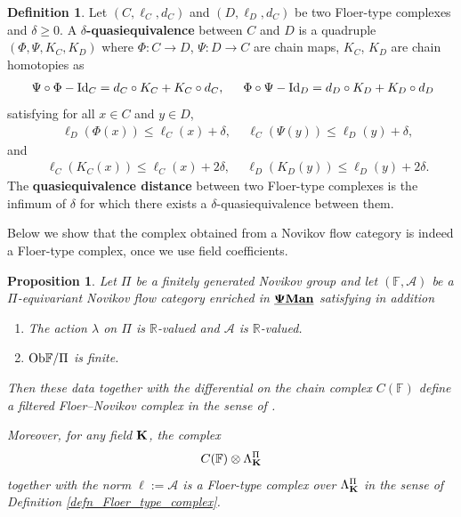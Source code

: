 \documentclass[reqno, 10pt]{amsart}
\numberwithin{equation}{section}
\numberwithin{equation}{section}
\newtheorem{prop}[thm]{Proposition}
\theoremstyle{definition}
\newtheorem{defn}[thm]{Definition}
\theoremstyle{remark}
\newcommand{\beqn}{\begin{equation*}}
\newcommand{\eeqn}{\end{equation*}}
\newcommand{\mb}{\mathbb}
\newcommand{\mc}{\mathcal}
\newcommand{\pman}{\uds{{\bf \Psi}{\bf Man}}}
\newcommand{\uds}[1]{\underline{\smash{#1}}}
\begin{document}
\begin{defn}
Let $(C, \ell_C, d_C)$ and $(D, \ell_D, d_C)$ be two Floer-type complexes and $\delta \geq 0$. A {\bf $\delta$-quasiequivalence} between $C$ and $D$ is a quadruple $(\Phi, \Psi, K_C, K_D)$ where $\Phi: C \to D$, $\Psi: D \to C$ are chain maps, $K_C$, $K_D$ are chain homotopies as
\begin{align*}
    &\ \Psi \circ \Phi - {\rm Id}_C = d_C \circ K_C + K_C \circ d_C,\ &\ \Phi \circ \Psi - {\rm Id}_D = d_D \circ K_D + K_D \circ d_D
\end{align*}
satisfying for all $x \in C$ and $y \in D$, 
\begin{align*}
&\ \ell_D(\Phi(x)) \leq \ell_C (x) + \delta,\ &\ \ell_C(\Psi(y)) \leq \ell_D (y) + \delta,
\end{align*}
and
\begin{align*}
&\ \ell_C(K_C(x)) \leq \ell_C(x) + 2\delta,\ &\ \ell_D(K_D(y)) \leq \ell_D(y) + 2\delta.
\end{align*}
The {\bf quasiequivalence distance} between two Floer-type complexes is the infimum of $\delta$ for which there exists a $\delta$-quasiequivalence between them. 
\end{defn}

Below we show that the complex obtained from a Novikov flow category is indeed a Floer-type complex, once we use field coefficients.

\begin{prop}\label{prop738}
Let $\Pi$ be a finitely generated Novikov group and let $({\mb F}, {\mc A})$ be a $\Pi$-equivariant Novikov flow category enriched in $\pman$ satisfying in addition
\begin{enumerate}

\item The action $\lambda$ on $\Pi$ is ${\mb R}$-valued and ${\mc A}$ is ${\mb R}$-valued.

\item ${\rm Ob}{\mb F}/\Pi$ is finite.
\end{enumerate}
Then these data together with the differential on the chain complex $C( {\mb F})$ define a filtered Floer--Novikov complex in the sense of \cite[Definition 1.1]{Usher_2008}. 

Moreover, for any field ${\bf K}$, the complex 
\beqn
C({\mb F}) \otimes \Lambda_{\bf K}^{\Pi}
\eeqn
together with the norm $\ell:= {\mc A}$ is a Floer-type complex over $\Lambda_{\bf K}^{\Pi}$ in the sense of Definition \ref{defn_Floer_type_complex}.
\end{prop}
\end{document}
